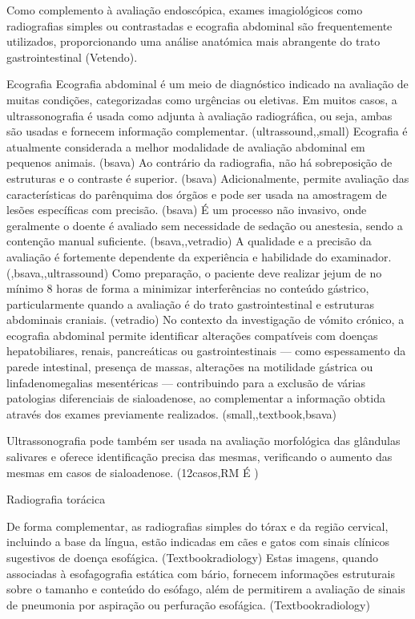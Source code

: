 Como complemento à avaliação endoscópica, exames imagiológicos como radiografias simples ou contrastadas e ecografia abdominal são frequentemente utilizados, proporcionando uma análise anatómica mais abrangente do trato gastrointestinal (Vetendo).


Ecografia 
Ecografia abdominal é um meio de diagnóstico indicado na avaliação de muitas condições, categorizadas como urgências ou eletivas. \cite{atlasultra} Em muitos casos, a ultrassonografia é usada como adjunta à avaliação radiográfica, ou seja, ambas são usadas e fornecem informação complementar. (ultrassound,\cite{atlasultra},small) Ecografia é atualmente considerada a melhor modalidade de avaliação abdominal em pequenos animais. (bsava) Ao contrário da radiografia, não há sobreposição de estruturas e o contraste é superior. (bsava) Adicionalmente, permite avaliação das características do parênquima dos órgãos e pode ser usada na amostragem de lesões específicas com precisão. (bsava) É um processo não invasivo, onde geralmente o doente é avaliado sem necessidade de sedação ou anestesia, sendo a contenção manual suficiente. (bsava,\cite{atlasultra},vetradio) A qualidade e a precisão da avaliação é fortemente dependente da experiência e habilidade do examinador. (\cite{frontiersdiagntest},bsava,\cite{atlasultra},ultrassound) Como preparação, o paciente deve realizar jejum de no mínimo 8 horas de forma a minimizar interferências no conteúdo gástrico, particularmente quando a avaliação é do trato gastrointestinal e estruturas abdominais craniais. (vetradio) No contexto da investigação de vómito crónico, a ecografia abdominal permite identificar alterações compatíveis com doenças hepatobiliares, renais, pancreáticas ou gastrointestinais — como espessamento da parede intestinal, presença de massas, alterações na motilidade gástrica ou linfadenomegalias mesentéricas — contribuindo para a exclusão de várias patologias diferenciais de sialoadenose, ao complementar a informação obtida através dos exames previamente realizados. (small,\cite{atlasultra},textbook,bsava)


Ultrassonografia pode também ser usada na avaliação morfológica das glândulas salivares e oferece identificação precisa das mesmas, verificando o aumento das mesmas em casos de sialoadenose. (12casos,RM É \cite{Gil2018})

Radiografia torácica


De forma complementar, as radiografias simples do tórax e da região cervical, incluindo a base da língua, estão indicadas em cães e gatos com sinais clínicos sugestivos de doença esofágica. (Textbookradiology) Estas imagens, quando associadas à esofagografia estática com bário, fornecem informações estruturais sobre o tamanho e conteúdo do esófago, além de permitirem a avaliação de sinais de pneumonia por aspiração ou perfuração esofágica. (Textbookradiology)


